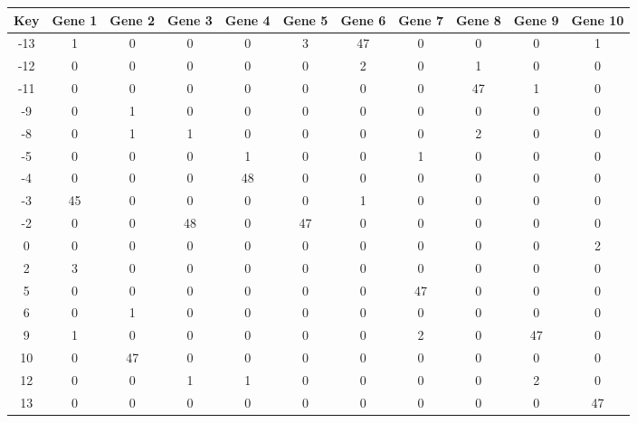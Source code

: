 \begin{tabular}{|c|c|c|c|c|c|c|c|c|c|c|}
\hline
Key & Gene 1 & Gene 2 & Gene 3 & Gene 4 & Gene 5 & Gene 6 & Gene 7 & Gene 8 & Gene 9 & Gene 10 \\
\hline
-13 & 1 & 0 & 0 & 0 & 3 & 47 & 0 & 0 & 0 & 1 \\
-12 & 0 & 0 & 0 & 0 & 0 & 2 & 0 & 1 & 0 & 0 \\
-11 & 0 & 0 & 0 & 0 & 0 & 0 & 0 & 47 & 1 & 0 \\
-9 & 0 & 1 & 0 & 0 & 0 & 0 & 0 & 0 & 0 & 0 \\
-8 & 0 & 1 & 1 & 0 & 0 & 0 & 0 & 2 & 0 & 0 \\
-5 & 0 & 0 & 0 & 1 & 0 & 0 & 1 & 0 & 0 & 0 \\
-4 & 0 & 0 & 0 & 48 & 0 & 0 & 0 & 0 & 0 & 0 \\
-3 & 45 & 0 & 0 & 0 & 0 & 1 & 0 & 0 & 0 & 0 \\
-2 & 0 & 0 & 48 & 0 & 47 & 0 & 0 & 0 & 0 & 0 \\
0 & 0 & 0 & 0 & 0 & 0 & 0 & 0 & 0 & 0 & 2 \\
2 & 3 & 0 & 0 & 0 & 0 & 0 & 0 & 0 & 0 & 0 \\
5 & 0 & 0 & 0 & 0 & 0 & 0 & 47 & 0 & 0 & 0 \\
6 & 0 & 1 & 0 & 0 & 0 & 0 & 0 & 0 & 0 & 0 \\
9 & 1 & 0 & 0 & 0 & 0 & 0 & 2 & 0 & 47 & 0 \\
10 & 0 & 47 & 0 & 0 & 0 & 0 & 0 & 0 & 0 & 0 \\
12 & 0 & 0 & 1 & 1 & 0 & 0 & 0 & 0 & 2 & 0 \\
13 & 0 & 0 & 0 & 0 & 0 & 0 & 0 & 0 & 0 & 47 \\
\hline
\end{tabular}